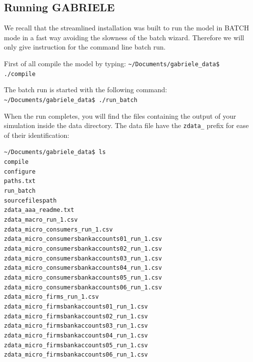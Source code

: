\documentclass{book}
\begin{document}
\subsection{Running GABRIELE}

We recall that the streamlined installation was built to run the model in BATCH mode in a fast way avoiding the slowness of the batch wizard. Therefore we will only give instruction for the command line batch run.

First of all compile the model by typing:
\vskip2mm
\noindent\verb+~/Documents/gabriele_data$ +\color{red}\verb|./compile| \color{black}
\vskip2mm

The batch run is started with the following command:
\vskip2mm
\noindent\verb+~/Documents/gabriele_data$ +\color{red}\verb|./run_batch| \color{black}
\vskip2mm

When the run completes, you will find the files containing the output of your simulation inside the data directory.
The data file have the \verb+zdata_+ prefix for ease of their identification: 

\vskip2mm
\noindent\verb+~/Documents/gabriele_data$ +\color{red}\verb|ls| \\ \color{green}
\verb+compile+ \\
\verb+configure+ \\ \color{blue}
\verb+paths.txt+ \\ \color{green}
\verb+run_batch+ \\ \color{blue}
\verb+sourcefilespath+ \\
\verb+zdata_aaa_readme.txt+ \\
\verb+zdata_macro_run_1.csv+ \\
\verb+zdata_micro_consumers_run_1.csv+ \\
\verb+zdata_micro_consumersbankaccounts01_run_1.csv+ \\
\verb+zdata_micro_consumersbankaccounts02_run_1.csv+ \\
\verb+zdata_micro_consumersbankaccounts03_run_1.csv+ \\
\verb+zdata_micro_consumersbankaccounts04_run_1.csv+ \\
\verb+zdata_micro_consumersbankaccounts05_run_1.csv+ \\
\verb+zdata_micro_consumersbankaccounts06_run_1.csv+ \\
\verb+zdata_micro_firms_run_1.csv+ \\
\verb+zdata_micro_firmsbankaccounts01_run_1.csv+ \\
\verb+zdata_micro_firmsbankaccounts02_run_1.csv+ \\
\verb+zdata_micro_firmsbankaccounts03_run_1.csv+ \\
\verb+zdata_micro_firmsbankaccounts04_run_1.csv+ \\
\verb+zdata_micro_firmsbankaccounts05_run_1.csv+ \\
\verb+zdata_micro_firmsbankaccounts06_run_1.csv+ \\
\vskip2mm
\color{black}
\end{document}
